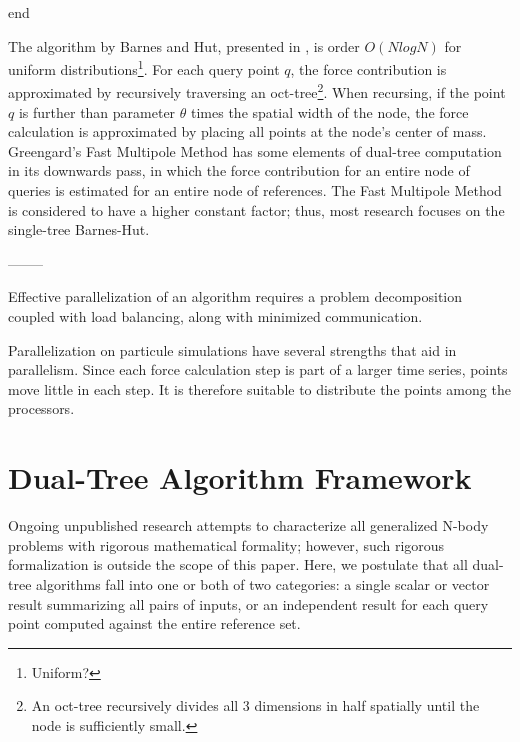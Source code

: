 \documentclass[times, 10pt,twocolumn]{article}
\begin{document}
end

The algorithm by Barnes and Hut, presented in \cite{barneshut}, is order $O(N log N)$ for uniform distributions\footnote{Uniform?}.
For each query point $q$, the force contribution is approximated by recursively traversing an oct-tree\footnote{An oct-tree recursively divides all 3 dimensions in half spatially until the node is sufficiently small.}.
When recursing, if the point $q$ is further than parameter $\theta$ times the spatial width of the node, the force calculation is approximated by placing all points at the node's center of mass.
Greengard's Fast Multipole Method \cite{greengard_fmm} has some elements of dual-tree computation in its downwards pass, in which the force contribution for an entire node of queries is estimated for an entire node of references.
The Fast Multipole Method is considered to have a higher constant factor; thus, most research focuses on the single-tree Barnes-Hut\cite{fmm_slower}.

--------

Effective parallelization of an algorithm requires a problem decomposition coupled with load balancing, along with minimized communication.

Parallelization on particule simulations have several strengths that aid in parallelism.
Since each force calculation step is part of a larger time series, points move little in each step.
It is therefore suitable to distribute the points among the processors.


\section{Dual-Tree Algorithm Framework}

Ongoing unpublished research attempts to characterize all generalized N-body problems with rigorous mathematical formality; however, such rigorous formalization is outside the scope of this paper.
Here, we postulate that all dual-tree algorithms fall into one or both of two categories: a single scalar or vector result summarizing all pairs of inputs, or an independent result for each query point computed against the entire reference set.
\end{document}
